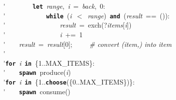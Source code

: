 \'\>~~~~~~~~\texttt{\textbf{let}}~\textit{range},~\textit{i}~=~\textit{back},~0:\\

\'\>~~~~~~~~~~~~\texttt{\textbf{while}}~(\textit{i}~$<$~\textit{range})~\texttt{\textbf{and}}~(\textit{result}~==~()):\\

\'\>~~~~~~~~~~~~~~~~\textit{result}~=~exch(?\textit{items}[\textit{i}])\\

\'\>~~~~~~~~~~~~~~~~\textit{i}~+=~1\\

\'\>~~~~\textit{result}~=~\textit{result}[0];~~~~~\emph{\# convert (item,) into item}\\

\'\>\\

\'\>\texttt{\textbf{for}}~\textit{i}~\texttt{\textbf{in}}~\{1..MAX\_ITEMS\}:\\

\'\>~~~~\texttt{\textbf{spawn}}~produce(\textit{i})\\

\'\>\texttt{\textbf{for}}~\textit{i}~\texttt{\textbf{in}}~\{1..\texttt{\textbf{choose}}(\{0..MAX\_ITEMS\})\}:\\

\'\>~~~~\texttt{\textbf{spawn}}~consume()